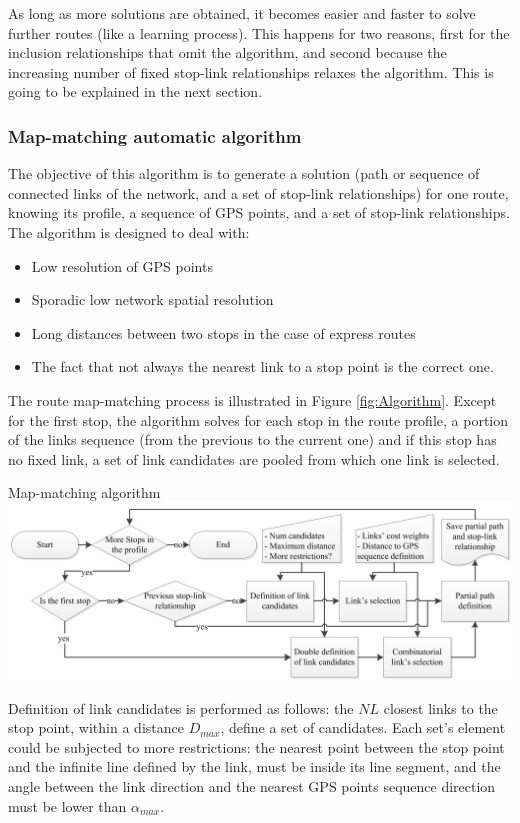 As long as more solutions are obtained, it becomes easier and faster to solve further routes (like a learning process). This happens for two reasons, first for the inclusion relationships that omit the algorithm, and second because the increasing number of fixed stop-link relationships relaxes the algorithm. This is going to be explained in the next section.

\subsubsection{Map-matching automatic algorithm}

The objective of this algorithm is to generate a solution (path or sequence of connected links of the network, and a set of stop-link relationships) for one route, knowing its profile, a sequence of GPS points, and a set of stop-link relationships. The algorithm is designed to deal with:

\begin{itemize}
\item	Low resolution of GPS points
\item	Sporadic low network spatial resolution
\item	Long distances between two stops in the case of express routes
\item	The fact that not always the nearest link to a stop point is the correct one.
\end{itemize}

The route map-matching process is illustrated in Figure \ref{fig:Algorithm}. Except for the first stop, the algorithm solves for each stop in the route profile, a portion of the links sequence (from the previous to the current one) and if this stop has no fixed link, a set of link candidates are pooled from which one link is selected.

\createfigure
{}
{Map-matching algorithm}
{\label{fig:Algorithm}}
{\includegraphics[width=1.0\textwidth]{extending/figures/semiAuto/Algorithm.png}}
{}

Definition of link candidates is performed as follows: the $NL$ closest links to the stop point, within a distance $D_{max}$, define a set of candidates. Each set's element could be subjected to more restrictions: the nearest point between the stop point and the infinite line defined by the link, must be inside its line segment, and the angle between the link direction and the nearest GPS points sequence direction must be lower than $\alpha_{max}$.

